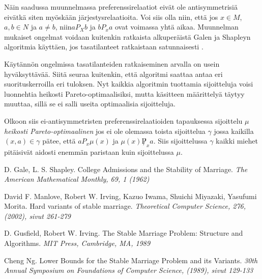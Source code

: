\documentclass[gradu, twoside]{tktltiki}
\begin{document}
Näin saadussa muunnelmassa preferenssirelaatiot eivät ole
antisymmetrisiä eivätkä siten myöskään järjestysrelaatioita. Voi siis
olla niin, että jos $x \in M$, $a,b \in N$ ja $a \neq b$, niin$aP_Xb$
ja $bP_xa$ ovat voimassa yhtä aikaa. Muunnelman mukaiset ongelmat
voidaan kuitenkin ratkaista alkuperäistä Galen ja Shapleyn algoritmia
käyttäen, jos tasatilanteet ratkaistaan satunnaisesti
\cite{gusfield89}.

Käytännön ongelmissa tasatilanteiden ratkaiseminen arvalla on usein
hyväksyttävää. Siitä seuraa kuitenkin, että algoritmi saattaa antaa
eri suorituskerroilla eri tuloksen. Nyt kaikkia algoritmin tuottamia
sijoitteluja voisi luonnehtia heikosti Pareto-optimaalisiksi, mutta
käsitteen määrittelyä täytyy muuttaa, sillä se ei salli useita
optimaalisia sijoitteluja.

Olkoon siis ei-antisymmetristen preferenssirelaatioiden tapauksessa
sijoittelu $\mu$ \emph{heikosti Pareto-optimaalinen} jos ei ole
olemassa toista sijoittelua $\gamma$ jossa kaikilla $(x, a) \in
\gamma$ pätee, että $aP_x\mu(x)$ ja $\mu(x)\not P_xa$. Siis
sijoittelussa $\gamma$ kaikki miehet pitäisivät aidosti enemmän
paristaan kuin sijoittelussa $\mu$.

\begin{thebibliography}{XXX99}

  D. Gale, L. S. Shapley.
  College Admissions and the Stability of Marriage.
  \emph{The American Mathematical Monthly, 69, 1 (1962)}

  David F. Manlove, Robert W. Irving, Kazuo Iwama, Shuichi Miyazaki,
  Yasufumi Morita.
  Hard variants of stable marriage.
  \emph{Theoretical Computer Science, 276, (2002), sivut 261-279}

  D. Gusfield, Robert W. Irving.
  The Stable Marriage Problem: Structure and Algorithms.
  \emph{MIT Press, Cambridge, MA, 1989}

  Cheng Ng.
  Lower Bounds for the Stable Marriage Problem and its Variants.
  \emph{30th Annual Symposium on Foundations of Computer Science,
    (1989), sivut 129-133}

\end{thebibliography}
\end{document}
